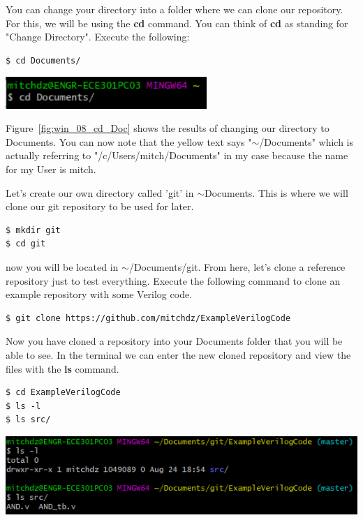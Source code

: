 \documentclass[12pt]{article}
\begin{document}
You can change your directory into a folder where we can clone our repository. For this, we will be using the \textbf{cd} command. You can think of \textbf{cd} as standing for "Change Directory". Execute the following:

\begin{lstlisting}
$ cd Documents/
\end{lstlisting}

\begin{center}
    \includegraphics[width=3in]{win_08_cd_Doc.PNG}
    \label{fig:win_08_cd_Doc}
\end{center}

Figure~\ref{fig:win_08_cd_Doc} shows the results of changing our directory to Documents. You can now note that the yellow text says "$\sim$/Documents" which is actually referring to "/c/Users/mitch/Documents" in my case because the name for my User is mitch.

Let's create our own directory called 'git' in $\sim$Documents. This is where we will clone our git repository to be used for later.

\begin{lstlisting}
$ mkdir git
$ cd git
\end{lstlisting}

now you will be located in $\sim$/Documents/git. From here, let's clone a reference repository just to test everything. Execute the following command to clone an example repository with some Verilog code.

\begin{lstlisting}
$ git clone https://github.com/mitchdz/ExampleVerilogCode
\end{lstlisting}

Now you have cloned a repository into your Documents folder that you will be able to see. In the terminal we can enter the new cloned repository and view the files with the \textbf{ls} command.

\begin{lstlisting}
$ cd ExampleVerilogCode
$ ls -l
$ ls src/
\end{lstlisting}

\begin{center}
    \includegraphics[width=6in]{win_bash_clone_2.PNG}
    \label{fig:win_bash_clone_2}
\end{center}
\end{document}
